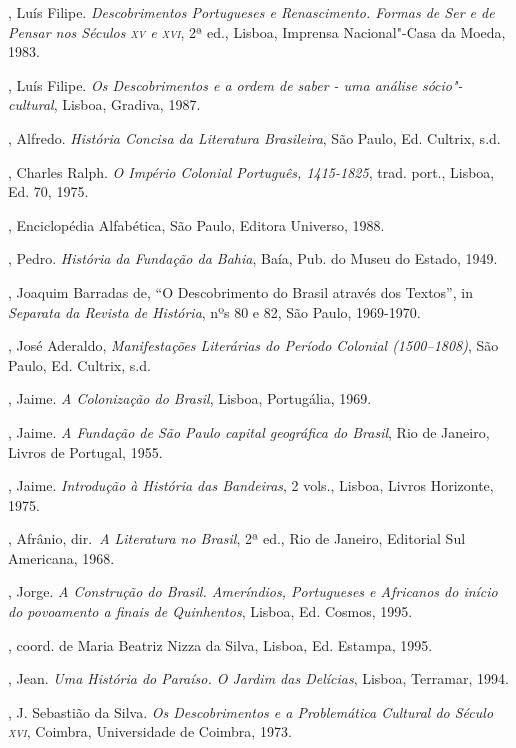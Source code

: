 \begin{bibliohedra}
, Luís Filipe. \textit{Descobrimentos Portugueses e
Renascimento. Formas de Ser e de Pensar nos Séculos \textsc{xv} e \textsc{xvi}}, 2ª ed.,
Lisboa, Imprensa Nacional"-Casa da Moeda, 1983.

, Luís Filipe. \textit{Os Descobrimentos e a ordem de saber -
uma análise sócio"-cultural}, Lisboa, Gradiva, 1987.

, Alfredo. \textit{História Concisa da Literatura Brasileira}, São
Paulo, Ed. Cultrix, s.d.

, Charles Ralph. \textit{O Império Colonial Português, 1415-1825}, 
trad. port., Lisboa, Ed. 70, 1975.

, Enciclopédia Alfabética, São
Paulo, Editora Universo, 1988.

, Pedro. \textit{História da Fundação da Bahia}, Baía, Pub. do
Museu do Estado, 1949.

, Joaquim Barradas de, ``O Descobrimento do Brasil através dos
Textos'', in \textit{Separata da Revista de História}, nºs 80 e 82, São
Paulo, 1969-1970.

, José Aderaldo, \textit{Manifestações Literárias do Período
Colonial (1500--1808)}, São Paulo, Ed. Cultrix, s.d.

, Jaime. \textit{A Colonização do Brasil}, Lisboa, Portugália,
1969.

, Jaime. \textit{A Fundação de São Paulo capital geográfica do
Brasil}, Rio de Janeiro, Livros de Portugal, 1955.

, Jaime. \textit{Introdução à História das Bandeiras}, 2
vols., Lisboa, Livros Horizonte, 1975.

, Afrânio, dir.~\textit{A Literatura no Brasil}, 2ª ed., Rio
de Janeiro, Editorial Sul Americana, 1968.

, Jorge. \textit{A Construção do Brasil. Ameríndios, Portugueses
e Africanos do início do povoamento a finais de Quinhentos}, Lisboa,
Ed. Cosmos, 1995.

, coord. de Maria
Beatriz Nizza da Silva, Lisboa, Ed. Estampa, 1995.

, Jean. \textit{Uma História do Paraíso. O Jardim das
Delícias}, Lisboa, Terramar, 1994.

, J. Sebastião da Silva. \textit{Os Descobrimentos e a
Problemática Cultural do Século \textsc{xvi}}, Coimbra, Universidade de Coimbra, 1973.


\end{bibliohedra}
